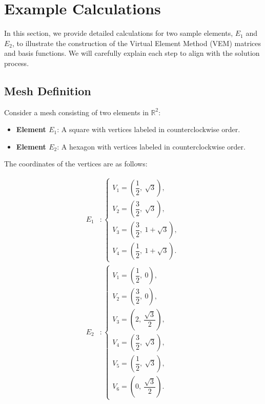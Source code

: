 \documentclass[class=article, crop=false]{standalone}
\begin{document}
\section{Example Calculations}

In this section, we provide detailed calculations for two sample elements, $E_1$ and $E_2$, to illustrate the construction of the Virtual Element Method (VEM) matrices and basis functions. We will carefully explain each step to align with the solution process.

\subsection{Mesh Definition}

Consider a mesh consisting of two elements in $\mathbb{R}^2$:

\begin{itemize}
    \item \textbf{Element $E_1$}: A square with vertices labeled in counterclockwise order.
    \item \textbf{Element $E_2$}: A hexagon with vertices labeled in counterclockwise order.
\end{itemize}

The coordinates of the vertices are as follows:

\begin{align*}
E_1 &: \begin{cases}
    V_1 = \left( \dfrac{1}{2},\ \sqrt{3} \right), \\
    V_2 = \left( \dfrac{3}{2},\ \sqrt{3} \right), \\
    V_3 = \left( \dfrac{3}{2},\ 1 + \sqrt{3} \right), \\ 
    V_4 = \left( \dfrac{1}{2},\ 1 + \sqrt{3} \right).
\end{cases} \\
E_2 &: \begin{cases}
    V_1 = \left( \dfrac{1}{2},\ 0 \right), \\ 
    V_2 = \left( \dfrac{3}{2},\ 0 \right), \\ 
    V_3 = \left( 2,\ \dfrac{\sqrt{3}}{2} \right), \\
    V_4 = \left( \dfrac{3}{2},\ \sqrt{3} \right), \\
    V_5 = \left( \dfrac{1}{2},\ \sqrt{3} \right), \\ 
    V_6 = \left( 0,\ \dfrac{\sqrt{3}}{2} \right).
\end{cases}
\end{align*}
\end{document}
